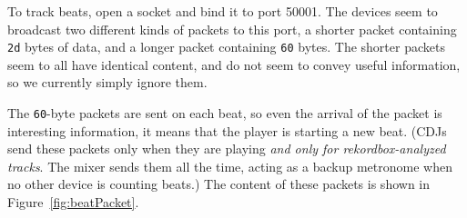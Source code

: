 \documentclass[11pt]{article}
\begin{document}
To track beats, open a socket and bind it to port 50001. The devices
seem to broadcast two different kinds of packets to this port, a
shorter packet containing {\tt 2d} bytes of data, and a longer packet
containing {\tt 60} bytes. The shorter packets seem to all have
identical content, and do not seem to convey useful information, so we
currently simply ignore them.

The {\tt 60}-byte packets are sent on each beat, so even the arrival
of the packet is interesting information, it means that the player is
starting a new beat. (CDJs send these packets only when they are
playing \emph{and only for rekordbox-analyzed tracks}. The mixer sends
them all the time, acting as a backup metronome when no other device
is counting beats.) The content of these packets is shown in
Figure~\ref{fig:beatPacket}.
\end{document}
